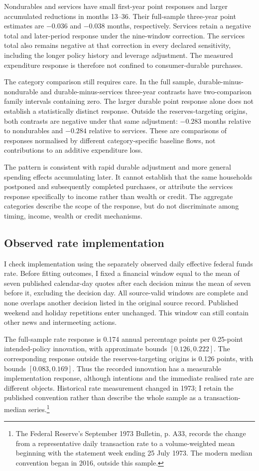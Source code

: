\documentclass[11pt,a4paper]{article}
\begin{document}
Nondurables and services have small first-year point responses and larger accumulated reductions in months 13--36. Their full-sample three-year point estimates are $-0.036$ and $-0.038$ months, respectively. Services retain a negative total and later-period response under the nine-window correction. The services total also remains negative at that correction in every declared sensitivity, including the longer policy history and leverage adjustment. The measured expenditure response is therefore not confined to consumer-durable purchases.

The category comparison still requires care. In the full sample, durable-minus-nondurable and durable-minus-services three-year contrasts have two-comparison family intervals containing zero. The larger durable point response alone does not establish a statistically distinct response. Outside the reserves-targeting origins, both contrasts are negative under that same adjustment: $-0.283$ months relative to nondurables and $-0.284$ relative to services. These are comparisons of responses normalised by different category-specific baseline flows, not contributions to an additive expenditure loss.

The pattern is consistent with rapid durable adjustment and more general spending effects accumulating later. It cannot establish that the same households postponed and subsequently completed purchases, or attribute the services response specifically to income rather than wealth or credit. The aggregate categories describe the scope of the response, but do not discriminate among timing, income, wealth or credit mechanisms.

\subsection{Observed rate implementation}

I check implementation using the separately observed daily effective federal funds rate. Before fitting outcomes, I fixed a financial window equal to the mean of seven published calendar-day quotes after each decision minus the mean of seven before it, excluding the decision day. All source-valid windows are complete and none overlaps another decision listed in the original source record. Published weekend and holiday repetitions enter unchanged. This window can still contain other news and intermeeting actions.

The full-sample rate response is 0.174 annual percentage points per 0.25-point intended-policy innovation, with approximate bounds $[0.126,0.222]$. The corresponding response outside the reserves-targeting origins is 0.126 points, with bounds $[0.083,0.169]$. Thus the recorded innovation has a measurable implementation response, although intentions and the immediate realised rate are different objects. Historical rate measurement changed in 1973; I retain the published convention rather than describe the whole sample as a transaction-median series.\footnote{The Federal Reserve's September 1973 Bulletin, p. A33, records the change from a representative daily transaction rate to a volume-weighted mean beginning with the statement week ending 25 July 1973. The modern median convention began in 2016, outside this sample.}
\end{document}
